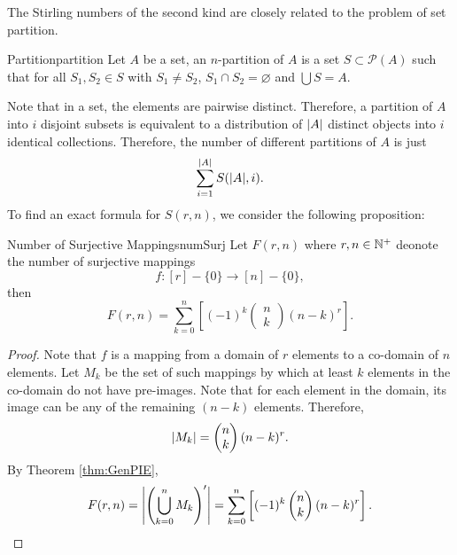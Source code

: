 \documentclass[math]{amznotes}
\theoremstyle{remark}
\begin{document}
The Stirling numbers of the second kind are closely related to the problem of set partition.
\begin{dfnbox}{Partition}{partition}
    Let $A$ be a set, an $n$-partition of $A$ is a set $S \subset \mathcal{P}(A)$ such that for all $S_1, S_2 \in S$ with $S_1 \neq S_2$, $S_1 \cap S_2 = \varnothing$ and $\bigcup S = A$.
\end{dfnbox}
Note that in a set, the elements are pairwise distinct. Therefore, a partition of $A$ into $i$ disjoint subsets is equivalent to a distribution of ${\left\lvert {A} \right\rvert}$ distinct objects into $i$ identical collections. Therefore, the number of different partitions of $A$ is just
\begin{equation*}
    \sum_{i = 1}^{{\left\lvert {A} \right\rvert}}S({\left\lvert {A} \right\rvert}, i).
\end{equation*}
To find an exact formula for $S(r, n)$, we consider the following proposition:
\begin{probox}{Number of Surjective Mappings}{numSurj}
    Let $F(r, n)$ where $r, n \in \mathbb{N}^+$ deonote the number of surjective mappings
    \begin{equation*}
        f \colon [r] - \{0\} \to [n] - \{0\},
    \end{equation*}
    then
    \begin{equation*}
        F(r, n) = \sum_{k = 0}^{n}\left[(-1)^k \begin{pmatrix}
            n \\
            k
        \end{pmatrix}(n - k)^r\right].
    \end{equation*}
    \tcblower
    \begin{proof}
        Note that $f$ is a mapping from a domain of $r$ elements to a co-domain of $n$ elements. Let $M_k$ be the set of such mappings by which at least $k$ elements in the co-domain do not have pre-images. Note that for each element in the domain, its image can be any of the remaining $(n - k)$ elements. Therefore, 
        \begin{equation*}
            {\left\lvert {M_k} \right\rvert} = \begin{pmatrix}
                n \\
                k
            \end{pmatrix}(n - k)^r.
        \end{equation*}
        By Theorem \ref{thm:GenPIE}, 
        \begin{equation*}
            F(r, n) = {\left\lvert {\left(\bigcup_{k = 0}^nM_k\right)'} \right\rvert} = \sum_{k = 0}^{n}\left[(-1)^k \begin{pmatrix}
                n \\
                k
            \end{pmatrix}(n - k)^r\right].
        \end{equation*}
    \end{proof}
\end{probox}
\end{document}
